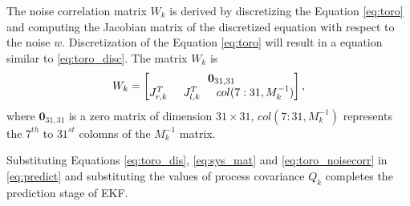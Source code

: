 The noise correlation matrix $W_k$ is derived by discretizing the Equation \ref{eq:toro} and computing the Jacobian matrix of the discretized equation with respect to the noise $w$. Discretization of the Equation \ref{eq:toro} will result in a equation similar to \ref{eq:toro_disc}. The matrix $W_k$ is 
\begin{equation}
    \label{eq:toro_noisecorr}
    W_k =  \begin{bmatrix}
        \textbf{0}_{31,31} \\ 
        J_{r,k}^T \hspace{5mm} J_{l,k}^T \hspace{5mm} col(7:31,M_k^{-1})
        \end{bmatrix},
\end{equation}
where $\textbf{0}_{31,31}$ is a zero matrix of dimension $31 \times 31$, $col(7:31,M_k^{-1})$ represents the $7^{th}$ to ${31}^{st}$ colomns of the $M_k^{-1}$ matrix.

Substituting Equations \ref{eq:toro_dis}, \ref{eq:sys_mat} and \ref{eq:toro_noisecorr} in \ref{eq:predict} and substituting the values of process covariance $Q_k$ completes the prediction stage of EKF.
